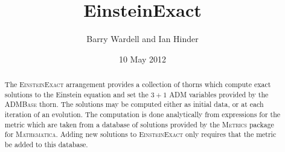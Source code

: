 \documentclass{article}
\begin{document}
\author{Barry Wardell and Ian Hinder}
\title{EinsteinExact}
\date{10 May 2012}

\maketitle


\begin{abstract}
The \textsc{EinsteinExact} arrangement provides a collection of thorns which compute
exact solutions to the Einstein equation and set the $3+1$ ADM variables
provided by the \textsc{ADMBase} thorn. The solutions may be computed either as initial
data, or at each iteration of an evolution. The computation is done analytically
from expressions for the metric which are taken from a database of solutions
provided by the \textsc{Metrics} package for \textsc{Mathematica}. Adding new
solutions to \textsc{EinsteinExact} only requires that the metric be added to this
database.
\end{abstract}
\end{document}
